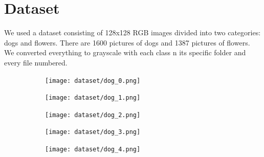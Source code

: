 \documentclass{report}
\begin{document}
\chapter{Dataset}
We used a dataset consisting of 128x128 RGB images divided into two categories: dogs and flowers. There are 1600 pictures of dogs and 1387 pictures of flowers.
We converted everything to grayscale with each class n its specific folder and every file numbered.

\begin{figure}[h!]
  \centering
  \hspace{-2cm}
  \begin{subfigure}[t]{0.24\textwidth}
    \centering
    \texttt{[image: dataset/dog\_0.png]}
    \label{fig:dataset-sub1}
  \end{subfigure}
  \hspace{-0.5cm}
  \begin{subfigure}[t]{0.24\textwidth}
    \centering
    \texttt{[image: dataset/dog\_1.png]}
    \label{fig:dataset-sub1}
  \end{subfigure}
  \hspace{-0.5cm}
  \begin{subfigure}[t]{0.24\textwidth}
    \centering
    \texttt{[image: dataset/dog\_2.png]}
    \label{fig:dataset-sub1}
  \end{subfigure}
  \hspace{-0.5cm}
  \begin{subfigure}[t]{0.24\textwidth}
    \centering
    \texttt{[image: dataset/dog\_3.png]}
    \label{fig:dataset-sub1}
  \end{subfigure}
  \hspace{-0.5cm}
  \begin{subfigure}[t]{0.24\textwidth}
    \centering
    \texttt{[image: dataset/dog\_4.png]}
    \label{fig:dataset-sub1}
  \end{subfigure}
  \hspace{-0.5cm}


\end{figure}
\end{document}

